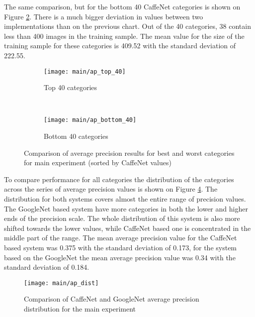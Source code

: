     The same comparison, but for the bottom 40 CaffeNet categories is shown on Figure \ref{fig:main-ap-bottom-40}. There is a much bigger deviation in values between two implementations than on the previous chart. Out of the 40 categories, 38 contain less than 400 images in the training sample. The mean value for the size of the training sample for these categories is 409.52 with the standard deviation of 222.55.  %
    
    
    \begin{figure}[H]
        \centering
        \begin{subfigure}[a]{0.95\textwidth}
            \texttt{[image: main/ap\_top\_40]}
            \caption{Top 40 categories}
            \label{fig:main-ap-top-40}
        \end{subfigure}
        \\
        \begin{subfigure}[a]{0.95\textwidth}
            \texttt{[image: main/ap\_bottom\_40]}
            \caption{Bottom 40 categories}
            \label{fig:main-ap-bottom-40}
        \end{subfigure}
        \caption[Main experiment. Average precision CaffeNet vs GoogleNet]{Comparison of average precision results for best and worst categories for main experiment (sorted by CaffeNet values)}
        \label{fig:main-ap}
    \end{figure}
    
    To compare performance for all categories the distribution of the categories across the series of average precision values is shown on Figure \ref{fig:main-ap-dist}. The distribution for both systems covers almost the entire range of precision values. The GoogleNet based system have more categories in both the lower and higher ends of the precision scale. The whole distribution of this system is also more shifted towards the lower values, while CaffeNet based one is concentrated in the middle part of the range. The mean average precision value for the CaffeNet based system was 0.375 with the standard deviation of 0.173, for the system based on the GoogleNet the mean average precision value was 0.34 with the standard deviation of 0.184.
    
    \begin{figure}[H]
        \centering
        \texttt{[image: main/ap\_dist]}
        \caption[Main experiment. Average precision distribution CaffeNet vs GoogleNet]{Comparison of CaffeNet and GoogleNet average precision distribution for the main experiment}
        \label{fig:main-ap-dist}
    \end{figure}
    

